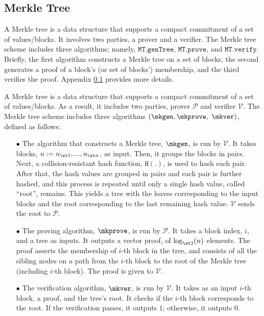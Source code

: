

\subsection{Merkle Tree}\label{sec::merkle-tree}

A Merkle tree is a data structure that supports a compact commitment of a set of values/blocks.  It involves two parties, a prover and a verifier. 
%
The Merkle tree scheme includes three algorithms; namely, $\mathtt{MT.genTree}$, $ \mathtt{MT.prove}$, and  $\mathtt{MT.verify}$. Briefly, the first algorithm constructs a Merkle tree on a set of blocks, the second generates a proof of a block's (or set of blocks') membership, and the third verifies the proof. Appendix \ref{sec::merkle-tree} provides more details. 




A Merkle tree is a data structure that supports a compact commitment of a set of values/blocks.  As a result, it includes two parties, prover $\mathcal{P}$ and verifier $\mathcal{V}$. The  Merkle tree scheme includes three algorithms $(\mkgen, \mkprove,$ $\mkver)$, defined as follows: 

\begin{itemize}
%
\item[$\bullet$] The algorithm that constructs a Merkle tree, $\mkgen$, is run by $\mathcal{V}$. It takes  blocks, $u:=u_{\st 1},...,u_{\st n}$, as input. Then, it groups the blocks  in pairs. Next,   a collision-resistant hash function, $\mathtt{H}(.)$, is used to hash each pair. After that, the hash values are grouped in pairs and each pair is further hashed, and this process is repeated until only a single hash value, called ``root'', remains. This yields a  tree with the leaves corresponding to the input blocks and the root corresponding to the last remaining hash value. $\mathcal{V}$ sends the root to $\mathcal{P}$.
%
\item[$\bullet$] The proving algorithm, $\mkprove$, is run by $\mathcal{P}$. It takes a block index, $i$, and a tree as inputs. It outputs a vector proof, of  $\log_{\st 2}(n)$ elements. The proof asserts the membership of $i$-th block in the tree, and consists of all the sibling nodes on a path from the $i$-th block to the root of the Merkle tree (including $i$-th block). The proof is given to $\mathcal{V}$.
%
\item[$\bullet$] The verification algorithm, $\mkver$, is run by $\mathcal{V}$. It takes as an input $i$-th block, a proof, and the tree's root. It checks if the $i$-th block corresponds to the root. If the verification passes, it outputs $1$; otherwise, it outputs $0$.

\end{itemize}

